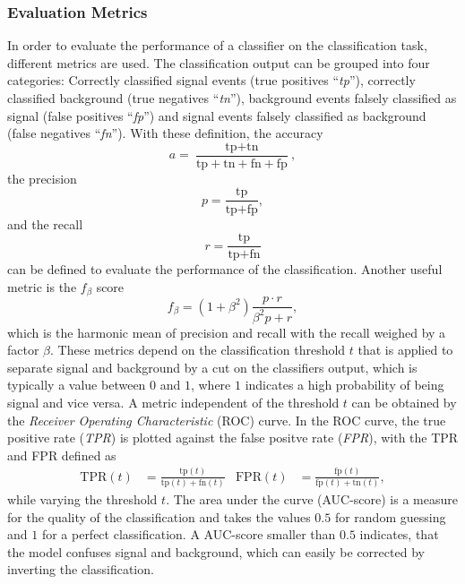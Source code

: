 \subsubsection{Evaluation Metrics}
\label{subsec:Evaluation}
In order to evaluate the performance of a classifier on the classification task, different metrics are used.
The classification output can be grouped into four categories: Correctly classified signal events (true positives \enquote{\textit{tp}}), correctly classified background 
(true negatives \enquote{\textit{tn}}), background events falsely classified as signal (false positives \enquote{\textit{fp}}) and signal events falsely classified as background
(false negatives \enquote{\textit{fn}}). With these definition, the accuracy 
\begin{equation}
    a = \frac{\text{tp} + \text{tn}}{\text{tp} + \text{tn} + \text{fn} + \text{fp}},
    \label{eq:accuracy}
\end{equation}
the precision
\begin{equation}
    p = \frac{\text{tp} }{\text{tp} + \text{fp}},
    \label{eq:precision}
\end{equation}
and the recall 
\begin{equation}
    r = \frac{\text{tp} }{\text{tp} + \text{fn}}
    \label{eq:recall}
\end{equation}
can be defined to evaluate the performance of the classification.
Another useful metric is the $f_\beta$ score
\begin{equation}
    f_\beta = (1 + \beta^2)\frac{p \cdot r}{\beta^2 p + r},
    \label{eq:f_beta}
\end{equation}
which is the harmonic mean of precision and recall with the recall weighed by a factor $\beta$.
These metrics depend on the classification threshold $t$ that is applied to separate signal and background by a cut on the classifiers output, which is typically a value 
between $0$ and $1$, where $1$ indicates a high probability of being signal and vice versa.
A metric independent of the threshold $t$ can be obtained by the \textit{Receiver Operating Characteristic} (ROC) curve. In the ROC curve, the true positive rate 
(\textit{TPR}) is plotted against the false positve rate (\textit{FPR}), with the TPR and FPR defined as 
\begin{align}
    \text{TPR}(t) &= \frac{\text{tp}(t)}{\text{tp}(t) + \text{fn}(t)} & \text{FPR}(t) &= \frac{\text{fp}(t)}{\text{fp}(t) + \text{tn}(t)},
    \label{eq:TPR_FPR}
\end{align}
while varying the threshold $t$. The area under the curve (AUC-score) is a measure for the quality of the classification and takes the values $\num{0.5}$ for random guessing 
and $\num{1}$ for a perfect classification. A AUC-score smaller than $\num{0.5}$ indicates, that the model confuses signal and background, which can easily be corrected by 
inverting the classification.
